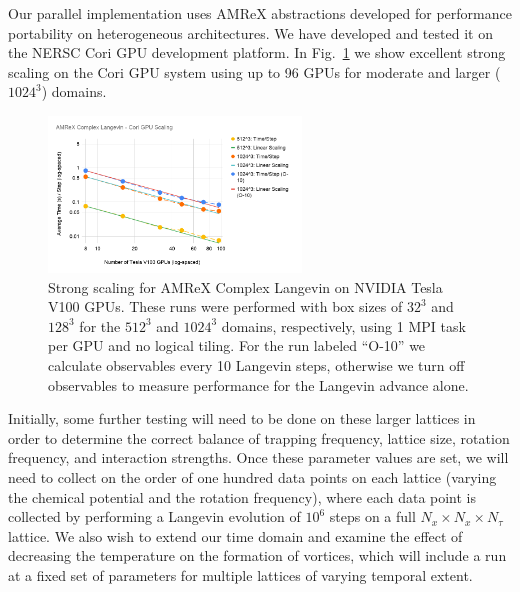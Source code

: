 \documentclass[onecolumn, 12pt]{article}
\begin{document}
Our parallel implementation uses AMReX abstractions developed for performance portability on heterogeneous architectures. We have developed and tested it on the NERSC Cori GPU development platform. %
In Fig.~\ref{Fig:GPUScaling} we show excellent strong scaling on the Cori GPU system using up to 96 GPUs for moderate and larger ($1024^3$) domains. 
%
%

%
\begin{figure}[h]
\centering
\includegraphics[width=0.6\textwidth]{./AMReX_Complex_Langevin_Cori_GPU_Scaling.png}
	\caption{\label{Fig:GPUScaling} Strong scaling for AMReX Complex Langevin on NVIDIA Tesla V100 GPUs. These runs were performed with box sizes of $32^3$ and $128^3$ for the $512^3$ and $1024^3$ domains, respectively, using 1 MPI task per GPU and no logical tiling. For the run labeled ``O-10'' we calculate observables every 10 Langevin steps, otherwise we turn off observables to measure performance for the Langevin advance alone.\vspace{-3mm}}
\end{figure}
%

Initially, some further testing will need to be done on these larger lattices in order to determine the correct balance of trapping frequency, lattice size, rotation frequency, and interaction strengths. Once these parameter values are set, we will need to collect on the order of one hundred data points on each lattice (varying the chemical potential and the rotation frequency), where each data point is collected by performing a Langevin evolution of $10^{6}$ steps on a full $N_{x} \times N_{x} \times N_{\tau}$ lattice. We also wish to extend our time domain and examine the effect of decreasing the temperature on the formation of vortices, which will include a run at a fixed set of parameters for multiple lattices of varying temporal extent. %

{}
%

\end{document}
